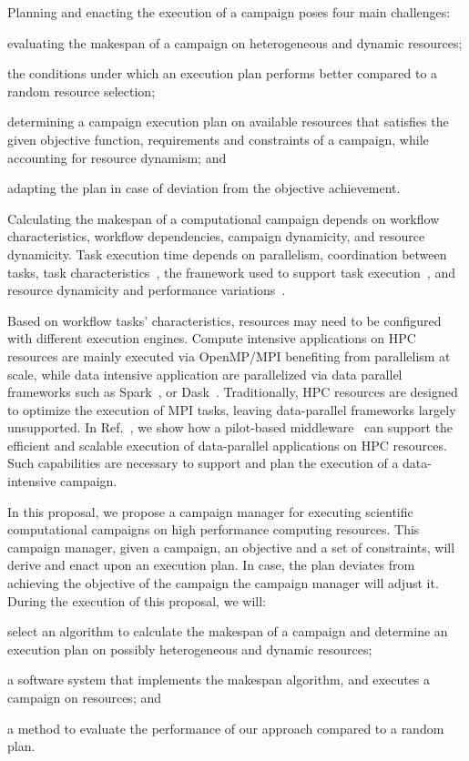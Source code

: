 Planning and enacting the execution of a campaign poses four main challenges: 
\begin{inparaenum}[(i)]
\item evaluating the makespan of a campaign on heterogeneous and dynamic resources;
\item the conditions under which an execution plan performs better compared to a random resource selection;
\item determining a campaign execution plan on available resources that satisfies the given objective function, requirements and constraints of a campaign, while accounting for resource dynamism; and
\item adapting the plan in case of deviation from the objective achievement.
\end{inparaenum}

Calculating the makespan of a computational campaign depends on workflow characteristics, workflow dependencies, campaign dynamicity, and resource dynamicity.
Task execution time depends on parallelism, coordination between tasks, task characteristics~\cite{khoshlessan2017parallel}, the framework used to support task execution~\cite{paraskevakos2018task}, and resource dynamicity and performance variations~\cite{paraskevakos2019workflow, pouchard2019computational}.

Based on workflow tasks’ characteristics, resources may need to be configured with different execution engines.
Compute intensive applications on HPC resources are mainly executed via OpenMP/MPI benefiting from parallelism at scale, while data intensive application are parallelized  via data parallel frameworks such as Spark~\cite{zaharia2010spark}, or Dask~\cite{rocklin2015dask}.
Traditionally, HPC resources are designed to optimize the execution of MPI tasks, leaving data-parallel frameworks largely unsupported.
In Ref.~\cite{luckow2016hadoop}, we show how a pilot-based middleware~\cite{merzky2019using} can support the efficient and scalable execution of data-parallel applications on HPC resources.
Such capabilities are necessary to support and plan the execution of a data-intensive campaign.

In this proposal, we propose a campaign manager for executing scientific computational campaigns on high performance computing resources.
This campaign manager, given a campaign, an objective and a set of constraints, will derive and enact upon an execution plan. 
In case, the plan deviates from achieving the objective of the campaign the campaign manager will adjust it.
During the execution of this proposal, we will:
\begin{inparaenum}[(1)]
\item select an algorithm to calculate the makespan of a campaign and determine an execution plan on possibly heterogeneous and dynamic resources;
\item a software system that implements the makespan algorithm, and executes a campaign on resources; and 
\item a method to evaluate the performance of our approach compared to a random plan. 
\end{inparaenum}

